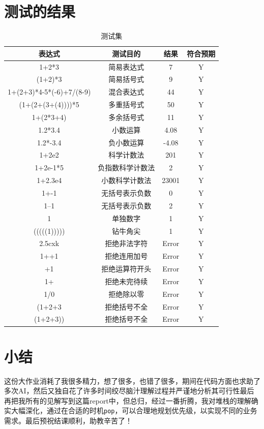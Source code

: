 \documentclass[UTF8]{ctexart}
\begin{document}
\section{测试的结果}
\begin{table}[ht]
\centering
\begin{tabular}{|c|c|c|c|}  %
\hline  %
表达式 &测试目的& 结果 &符合预期\\  %
\hline
1+2*3 &简易表达式&  7&Y\\  %
\hline
(1+2)*3 &简易括号式&  9&Y\\  %
\hline
 1+(2+3)*4-5*(-6)+7/(8-9) &混合表达式&  44&Y\\
\hline
 (1+(2+(3+(4))))*5 &多重括号式&  50&Y\\
\hline
 1+(2*3+4)&多余括号式&  11&Y\\
\hline
 1.2*3.4 &小数运算& 4.08&Y\\
\hline
 1.2*-3.4 &负小数运算& -4.08&Y\\
\hline
 1+2e2 &科学计数法& 201&Y\\
\hline
 1+2e-1*5&负指数科学计数法& 2&Y\\
\hline
 1+2.3e4& 小数科学计数法& 23001&Y\\
\hline
 1+-1 &无括号表示负数& 0&Y\\\hline
 1--1&无括号表示负数& 2&Y\\\hline
 1 &单独数字& 1&Y\\\hline
 (((((1))))) &钻牛角尖& 1&Y\\\hline
 2.5cxk&拒绝非法字符& Error&Y\\
\hline
 1++1 &拒绝连用加号& Error&Y\\
\hline
 +1 &拒绝运算符开头& Error&Y\\
\hline
 1+ &拒绝未完待续& Error&Y\\
\hline
 1/0 &拒绝除以零& Error&Y\\
\hline
 (1+2+3 &拒绝括号不全& Error&Y\\
\hline
 (1+2+3))&拒绝括号不全& Error&Y\\
\hline
\end{tabular}
\caption{测试集}
\end{table}


\section{小结}
这份大作业消耗了我很多精力，想了很多，也错了很多，期间在代码方面也求助了多次AI，然后又独自花了许多时间绞尽脑汁理解过程并严谨地分析其可行性最后再把我所有的见解写到这篇report中，但总归，经过一番折腾，我对堆栈的理解确实大幅深化，通过在合适的时机\verb|pop|，可以合理地规划优先级，以实现不同的业务需求。最后预祝结课顺利，助教辛苦了！
\end{document}
